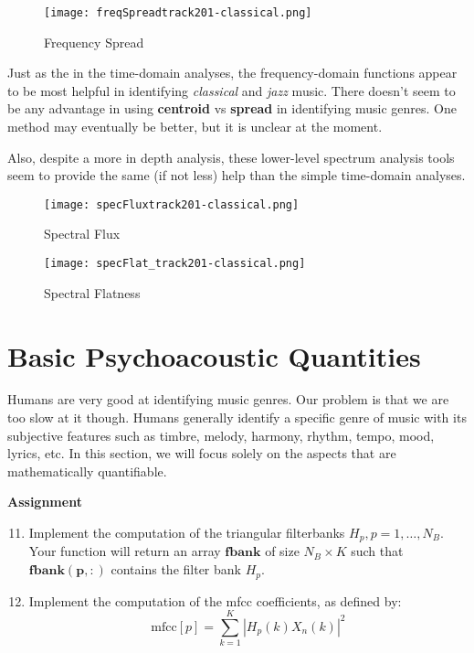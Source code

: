 \documentclass{article} %
\begin{document}
\begin{figure}
\centering
\texttt{[image: freqSpreadtrack201-classical.png]}
\caption{Frequency Spread}
\label{fig:spread_201}
\end{figure}



Just as the in the time-domain analyses, the frequency-domain functions appear to be most helpful in identifying \emph{classical} and \emph{jazz} music. 
There doesn't seem to be any advantage in using \textbf{centroid} vs \textbf{spread} in identifying music genres. One method may eventually be better, but it is unclear at the moment. 

Also, despite a more in depth analysis, these lower-level spectrum analysis tools seem to provide the same (if not less) help than the simple time-domain analyses. 

\begin{figure}[H]
\centering
\texttt{[image: specFluxtrack201-classical.png]}
\caption{Spectral Flux}
\label{fig:flux_201}
\end{figure}

\begin{figure}[H]
\centering
\texttt{[image: specFlat\_track201-classical.png]}
\caption{Spectral Flatness}
\label{fig:flat_201}
\end{figure}

\section{Basic Psychoacoustic Quantities}
Humans are very good at identifying music genres. Our problem is that we are too slow at it though. Humans generally identify a specific genre of music with its subjective features
such as timbre, melody, harmony, rhythm, tempo, mood, lyrics, etc. In this section, we will focus solely on the aspects that are mathematically quantifiable. 

\begin{framed}
\textbf{Assignment}
\begin{enumerate}
\setcounter{enumi}{10}
\item Implement the computation of the triangular filterbanks $H_p,p=1,\dots ,N_B$. Your function will return an array $\mathbf{fbank}$ of size $N_B \times K$ such that
$\mathbf{fbank(p,:)}$ contains the filter bank $H_p$. 
\item Implement the computation of the mfcc coefficients, as defined by:
\begin{equation}
\text{mfcc}[p]=\sum\limits_{k=1}^{K}|H_p(k)X_n(k)|^2
\end{equation}
\end{enumerate}
\end{framed}
\end{document}
